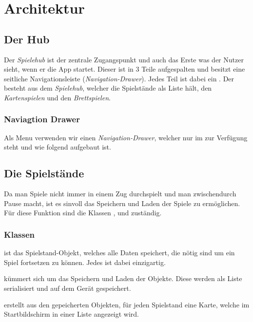 \chapter{Architektur}

\section{Der Hub}
\sectionauthor{\leonard}

Der \emph{Spielehub} ist der zentrale Zugangspunkt und auch das Erste was der 
Nutzer sieht, wenn er die App startet. Dieser ist in 3 Teile aufgespalten und besitzt 
eine seitliche Navigationsleiste (\emph{Navigation-Drawer}). Jedes Teil ist dabei
ein . Der  besteht aus dem \emph{Spielehub}, welcher 
die Spielstände als Liste hält, den \emph{Kartenspielen} und den \emph{Brettspielen}.


\subsection{Naviagtion Drawer}

Als Menu verwenden wir einen \emph{Navigation-Drawer}, welcher nur im  
zur Verfügung steht und wie folgend aufgebaut ist. 

\section{Die Spielstände}
\sectionauthor{\leonard}

Da man Spiele nicht immer in einem Zug durchspielt und man zwischendurch Pause
macht, ist es sinvoll das Speichern und Laden der Spiele zu ermöglichen. Für
diese Funktion sind die Klassen ,  und
 zuständig.

\subsection{Klassen}

 ist das Spielstand-Objekt, welches alle Daten speichert, die
nötig sind um ein Spiel fortsetzen zu können. Jedes  ist dabei
einzigartig.

 kümmert sich um das Speichern und Laden der
 Objekte. Diese werden als Liste serialisiert und auf dem Gerät
gespeichert.

 erstellt aus den gepeicherten  Objekten,
für jeden Spielstand eine Karte, welche im Startbildschirm in einer Liste
angezeigt wird.

